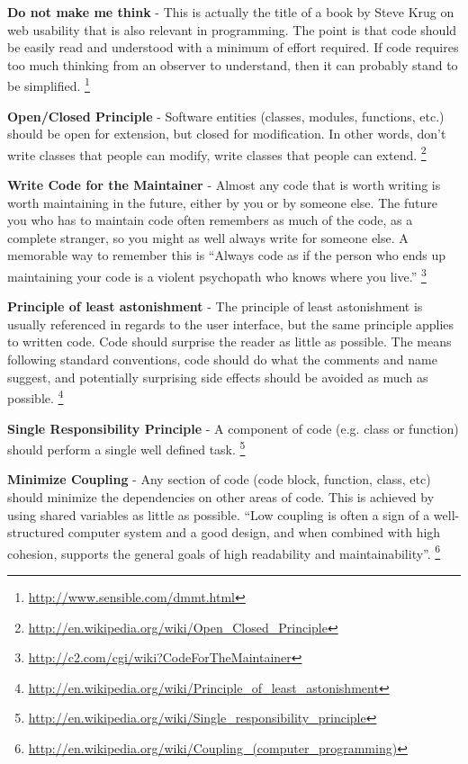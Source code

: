 \textbf{Do not make me think} - This is actually the title of a book by Steve Krug on
web usability that is also relevant in programming. The point is that code
should be easily read and understood with a minimum of effort required. If code
requires too much thinking from an observer to understand, then it can probably
stand to be simplified. \footnote{\url{http://www.sensible.com/dmmt.html}}

\textbf{Open/Closed Principle} - Software entities (classes, modules, functions, etc.)
should be open for extension, but closed for modification. In other words,
don't write classes that people can modify, write classes that people can
extend. \footnote{\url{http://en.wikipedia.org/wiki/Open_Closed_Principle}}

\textbf{Write Code for the Maintainer} - Almost any code that is worth writing is worth
maintaining in the future, either by you or by someone else. The future you who
has to maintain code often remembers as much of the code, as a complete
stranger, so you might as well always write for someone else. A memorable way
to remember this is ``Always code as if the person who ends up maintaining your
code is a violent psychopath who knows where you live.''
\footnote{\url{http://c2.com/cgi/wiki?CodeForTheMaintainer}}

\textbf{Principle of least astonishment} - The principle of least astonishment is
usually referenced in regards to the user interface, but the same principle
applies to written code. Code should surprise the reader as little as possible.
The means following standard conventions, code should do what the comments and
name suggest, and potentially surprising side effects should be avoided as much
as possible.
\footnote{\url{http://en.wikipedia.org/wiki/Principle_of_least_astonishment}}

\textbf{Single Responsibility Principle} - A component of code (e.g. class or function)
should perform a single well defined task.
\footnote{\url{http://en.wikipedia.org/wiki/Single_responsibility_principle}}

\textbf{Minimize Coupling} - Any section of code (code block, function, class, etc)
should minimize the dependencies on other areas of code. This is achieved by
using shared variables as little as possible. ``Low coupling is often a sign of
a well-structured computer system and a good design, and when combined with
high cohesion, supports the general goals of high readability and
maintainability''.
\footnote{\url{http://en.wikipedia.org/wiki/Coupling_(computer_programming)}}

